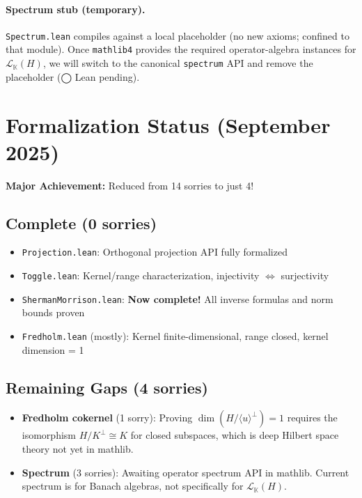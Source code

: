 \documentclass[11pt]{article}
\theoremstyle{definition}
\newcommand{\K}{\mathbb{K}}
\newcommand{\CL}[2]{\mathcal{L}_{#1}(#2)} %
\newcommand{\leanpending}{\textsf{\small \textcolor{orange!80!black}{◯ Lean pending}}}
\begin{document}
\paragraph{Spectrum stub (temporary).}
\texttt{Spectrum.lean} compiles against a local placeholder (no new axioms; confined to that module). Once \texttt{mathlib4} provides the required operator-algebra instances for $\CL{\K}{H}$, we will switch to the canonical \texttt{spectrum} API and remove the placeholder (\leanpending).

\section{Formalization Status (September 2025)}

\textbf{Major Achievement:} Reduced from 14 sorries to just 4!

\subsection{Complete (0 sorries)}
\begin{itemize}
\item \texttt{Projection.lean}: Orthogonal projection API fully formalized
\item \texttt{Toggle.lean}: Kernel/range characterization, injectivity $\Leftrightarrow$ surjectivity
\item \texttt{ShermanMorrison.lean}: \textbf{Now complete!} All inverse formulas and norm bounds proven
\item \texttt{Fredholm.lean} (mostly): Kernel finite-dimensional, range closed, kernel dimension = 1
\end{itemize}

\subsection{Remaining Gaps (4 sorries)}
\begin{itemize}
\item \textbf{Fredholm cokernel} (1 sorry): Proving $\dim(H/\langle u\rangle^\perp) = 1$ requires the isomorphism $H/K^\perp \cong K$ for closed subspaces, which is deep Hilbert space theory not yet in mathlib.
\item \textbf{Spectrum} (3 sorries): Awaiting operator spectrum API in mathlib. Current spectrum is for Banach algebras, not specifically for $\mathcal{L}_\mathbb{K}(H)$.
\end{itemize}
\end{document}
